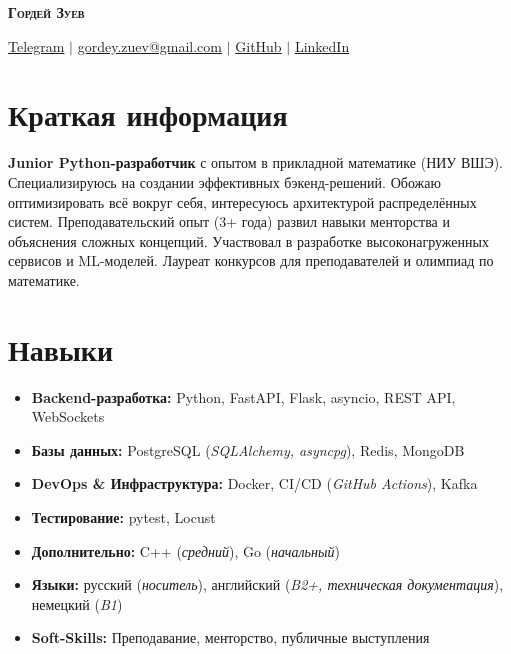 \documentclass[letterpaper,11pt]{article}
\begin{document}
\begin{center}
    \textsc{\Huge{\textbf{Гордей Зуев}}} \\ \vspace{1pt}
    
    \href{{https://t.me/gordeyzuev}}{\textcolor{blue!50!black}{Telegram}} $|$
    \href{mailto:gordey.zuev@gmail.com}{\textcolor{blue!50!black} {gordey.zuev@gmail.com}} $|$
    \href{https://github.com/GordeyZuev}{\textcolor{blue!50!black}{GitHub}} $|$
    \href{{https://www.linkedin.com/in/gordey-zuev/}}{\textcolor{blue!50!black}{LinkedIn}}
\end{center}


\section{Краткая информация}
 \begin{itemize}[leftmargin=0.15in, label={}]
    \small{\item{
     \textbf{Junior Python-разработчик} с опытом в прикладной математике (НИУ ВШЭ). Специализируюсь на создании эффективных бэкенд-решений. Обожаю оптимизировать всё вокруг себя, интересуюсь архитектурой распределённых систем. Преподавательский опыт (3+ года) развил навыки менторства и объяснения сложных концепций. Участвовал в разработке высоконагруженных сервисов и ML-моделей. Лауреат конкурсов для преподавателей и олимпиад по математике.
    }}
 \end{itemize}


 \section{Навыки}
\begin{itemize}[leftmargin=0.15in, label={}, nosep]
    \small
    \item \textbf{Backend-разработка:} 
          Python, FastAPI, Flask, asyncio, REST API, WebSockets
    
    \item \textbf{Базы данных:} 
          PostgreSQL (\textit{SQLAlchemy, asyncpg}), 
          Redis, 
          MongoDB
    
    \item \textbf{DevOps \& Инфраструктура:} 
          Docker, 
          CI/CD (\textit{GitHub Actions}), 
          Kafka
    
    \item \textbf{Тестирование:} 
          pytest, Locust
    
    \item \textbf{Дополнительно:} 
           C++ (\textit{средний}), Go (\textit{начальный})
    
    \item \textbf{Языки:} 
          русский (\textit{носитель}),
          английский (\textit{B2+, техническая документация}), 
          немецкий (\textit{B1})

    \item \textbf{Soft-Skills:}
        Преподавание,
        менторство,
        публичные выступления
    
\end{itemize}
\end{document}
